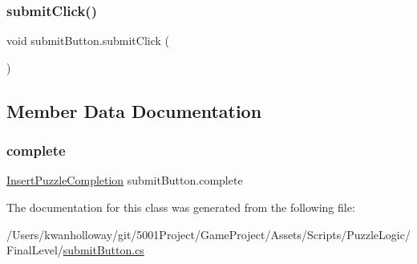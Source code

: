 \subsubsection{\texorpdfstring{submit\+Click()}{submitClick()}}
{\footnotesize\ttfamily void submit\+Button.\+submit\+Click (\begin{DoxyParamCaption}{ }\end{DoxyParamCaption})}



\subsection{Member Data Documentation}
\mbox{\label{classsubmit_button_a1346ad28f62e29199c2f2fb7859d47cb}} 
\subsubsection{\texorpdfstring{complete}{complete}}
{\footnotesize\ttfamily \hyperlink{class_insert_puzzle_completion}{Insert\+Puzzle\+Completion} submit\+Button.\+complete}



The documentation for this class was generated from the following file\+:\begin{DoxyCompactItemize}
\item 
/\+Users/kwanholloway/git/5001\+Project/\+Game\+Project/\+Assets/\+Scripts/\+Puzzle\+Logic/\+Final\+Level/\hyperlink{submit_button_8cs}{submit\+Button.\+cs}\end{DoxyCompactItemize}
